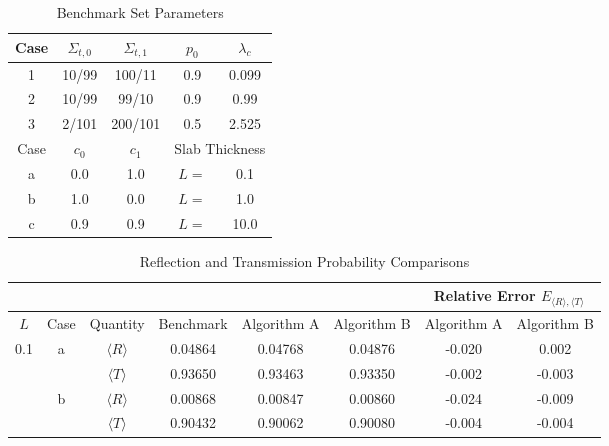 \documentclass{nseJournal}
\begin{document}
\begin{table}%
\centering
\caption{Benchmark Set Parameters}
\label{tab:params}
\begin{tabular}{|ccccc|}
\hline
    Case & \(\Sigma_{t,0}\) & \(\Sigma_{t,1}\) & \(p_0\) & \(\lambda_c\) \\ \hline
    1               & 10/99 & 100/11 & 0.9 & 0.099\\
    2               & 10/99 & 99/10   & 0.9 & 0.99 \\
    3               & 2/101 & 200/101  & 0.5 & 2.525 \\ \hline
\hline
    Case  & $c_0$ & $c_1$ &  \multicolumn{2}{|c|}{Slab Thickness}  \\ \hline
    a               & 0.0 & 1.0 & \multicolumn{1}{|c}{\(L=\)} & 0.1 \\
    b               & 1.0 & 0.0 & \multicolumn{1}{|c}{\(L=\)} & 1.0 \\
    c               & 0.9 & 0.9 & \multicolumn{1}{|c}{\(L=\)} & 10.0 \\ \hline
\end{tabular}
\end{table}

\begin{table}[b]%
\centering
\caption{Reflection and Transmission Probability Comparisons}
\label{tab:results}
\begin{tabular}{|c|c|c|c|c|c|c|c|}
\hline
            &         &              &                 &                   &                  & \multicolumn{2}{c|}{Relative Error $E_{\langle R \rangle,\langle T \rangle}$} \\\hline
    \(L\)   & Case & Quantity & Benchmark & Algorithm A & Algorithm B & Algorithm A & Algorithm B \\ \hline \hline
    \multirow{4}{*}{0.1}   & \multirow{2}{*}{a} & \(\langle R \rangle\) & 0.04864 & 0.04768 & 0.04876 & -0.020 & 0.002 \\
                                     &                              & \(\langle T \rangle\) & 0.93650 & 0.93463 & 0.93350 & -0.002 & -0.003 \\ \cline{2-8}
                                     & \multirow{2}{*}{b} & \(\langle R \rangle\) & 0.00868 & 0.00847 & 0.00860 & -0.024 & -0.009 \\
                                     &                              & \(\langle T \rangle\) & 0.90432 & 0.90062 & 0.90080 & -0.004 & -0.004 \\ \hline
\end{tabular}
\end{table}
\end{document}
